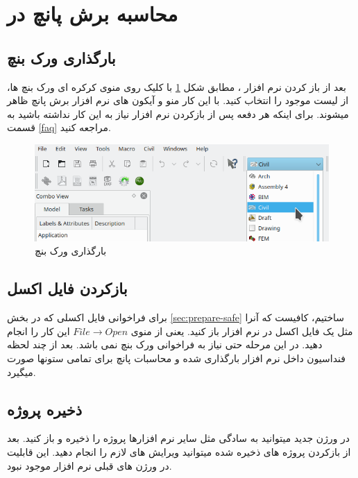 \section{محاسبه برش پانچ در }

\subsection{بارگذاری ورک بنچ \label{sec:loadingcivil}}
بعد از باز کردن نرم افزار 
، مطابق شکل
\ref{fig:civil-workbench}
با کلیک روی منوی کرکره ای ورک بنچ ها، از لیست موجود 
را انتخاب کنید. با این کار منو و آیکون های نرم افزار برش پانچ ظاهر میشوند. برای اینکه هر دفعه پس از بازکردن نرم افزار نیاز به این کار نداشته باشید به قسمت
\ref{faq}
 مراجعه کنید.

\begin{figure}[H]
    \centering
    \includegraphics[width=\linewidth]{figures/civil}
    \caption{بارگذاری ورک بنچ }
    \label{fig:civil-workbench}
\end{figure}
\subsection{بازکردن فایل اکسل}
برای فراخوانی فایل اکسلی که در بخش 
\ref{sec:prepare-safe}
ساختیم، کافیست که آنرا مثل یک فایل اکسل در نرم افزار باز کنید. یعنی از منوی
$File \rightarrow Open$
این کار را انجام دهید. در این مرحله حتی نیاز به فراخوانی ورک بنچ 
نمی باشد. بعد از چند لحظه فنداسیون داخل نرم افزار بارگذاری شده و محاسبات پانچ برای تمامی ستونها صورت میگیرد.

\subsection{ذخیره پروژه}
در ورژن جدید میتوانید به سادگی مثل سایر نرم افزارها پروژه را ذخیره و باز کنید. بعد از بازکردن پروژه های ذخیره شده میتوانید ویرایش های لازم را انجام دهید. این قابلیت در 
ورژن های قبلی نرم افزار موجود نبود.